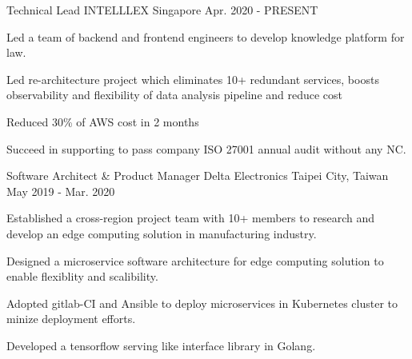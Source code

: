 

\begin{cventries}

  \cventry
    {Technical Lead} %
    {INTELLLEX} %
    {Singapore} %
    {Apr. 2020 - PRESENT} %
    {
      \begin{cvitems} %
        \item {Led a team of backend and frontend engineers to develop knowledge platform for law.}
        \item {Led re-architecture project which eliminates 10+ redundant services, boosts observability
and flexibility of data analysis pipeline and reduce cost}
        \item {Reduced 30\% of AWS cost in 2 months}
        \item {Succeed in supporting to pass company ISO 27001 annual audit without any NC.}
      \end{cvitems}
    }

  \cventry
    {Software Architect \& Product Manager} %
    {Delta Electronics} %
    {Taipei City, Taiwan} %
    {May 2019 - Mar. 2020} %
    {
      \begin{cvitems} %
        \item {Established a cross-region project team with 10+ members to research and develop an edge computing solution in manufacturing industry.}
        \item {Designed a microservice software architecture for edge computing solution to enable flexiblity and scalibility.}
        \item {Adopted gitlab-CI and Ansible to deploy microservices in Kubernetes cluster to minize deployment efforts.}
        \item {Developed a tensorflow serving like interface library in Golang.}
      \end{cvitems}
    }


\end{cventries}
